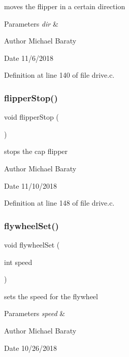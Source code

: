 moves the flipper in a certain direction 


\begin{DoxyParams}{Parameters}
{\em dir} & \\
\hline
\end{DoxyParams}
\begin{DoxyAuthor}{Author}
Michael Baraty 
\end{DoxyAuthor}
\begin{DoxyDate}{Date}
11/6/2018 
\end{DoxyDate}


Definition at line 140 of file drive.\+c.

\mbox{\label{drive_8h_ad2b33937a785dc4201bcae5b6ed66b9f}} 
\subsubsection{flipper\+Stop()}
{\footnotesize\ttfamily void flipper\+Stop (\begin{DoxyParamCaption}{ }\end{DoxyParamCaption})}



stops the cap flipper 

\begin{DoxyAuthor}{Author}
Michael Baraty 
\end{DoxyAuthor}
\begin{DoxyDate}{Date}
11/10/2018 
\end{DoxyDate}


Definition at line 148 of file drive.\+c.

\mbox{\label{drive_8h_a60e483906879d9558762282b5d5b581b}} 
\subsubsection{flywheel\+Set()}
{\footnotesize\ttfamily void flywheel\+Set (\begin{DoxyParamCaption}\item[{int}]{speed }\end{DoxyParamCaption})}



sets the speed for the flywheel 


\begin{DoxyParams}{Parameters}
{\em speed} & \\
\hline
\end{DoxyParams}
\begin{DoxyAuthor}{Author}
Michael Baraty 
\end{DoxyAuthor}
\begin{DoxyDate}{Date}
10/26/2018 
\end{DoxyDate}


